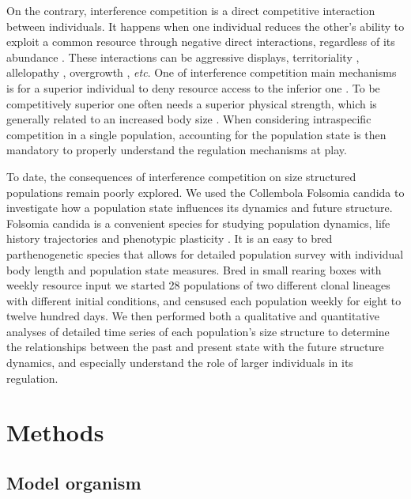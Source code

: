 On the contrary, interference competition is a direct competitive interaction
between individuals. It happens when one individual reduces the other’s ability
to exploit a common resource through negative direct interactions, regardless of
its abundance \autocites{park1954a,vance1984a}. These interactions can be
aggressive displays\autocites{schoener1976a}, territoriality
\autocites{walls1990a,kennedy1996a}, allelopathy
\autocites{harper1977a,rice1984a,nilsson1994a}, overgrowth
\autocites{connell1961a,paine1966a}, \textit{etc}. One of interference
competition main mechanisms is for a superior individual to deny resource access
to the inferior one \autocites{schoener1983a,thompson1993a}. To be
competitively superior one often needs a superior physical strength, which is generally related to an
increased body size \autocites{mccormick2012a}.
When considering intraspecific competition in a single population, accounting
for the population state is then mandatory to properly understand the regulation
mechanisms at play.

To date, the consequences of interference competition on size structured
populations remain poorly explored. We used the Collembola Folsomia candida to
investigate how a population state influences its dynamics and future structure.
Folsomia candida is a convenient species for studying population dynamics, life
history trajectories and phenotypic plasticity
\autocites{tully2005a,tully2008a}.
It is an easy to bred parthenogenetic species \autocites{fountain2005a} that
allows for detailed population survey with individual body length and population
state measures.
Bred in small rearing boxes with weekly resource input \autocites{tully2008a} we
started 28 populations of two different clonal lineages with different initial
conditions, and censused each population weekly for eight to twelve hundred
days. We then performed both a qualitative and quantitative analyses of detailed
time series of each population’s size structure to determine the relationships
between the past and present state with the future structure dynamics, and
especially understand the role of larger individuals in its regulation.

\section{Methods}

\subsection{Model organism}

